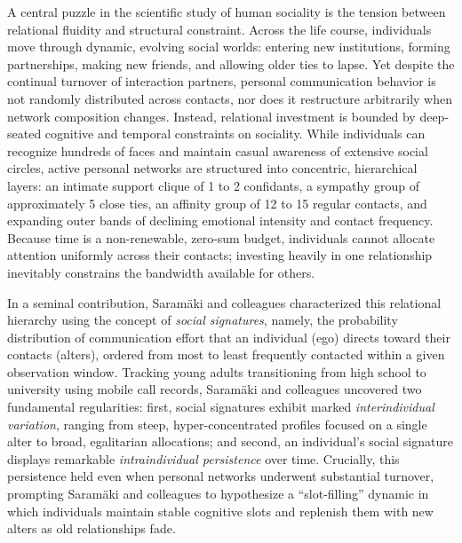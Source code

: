 \documentclass[11pt,letterpaper]{article}
\begin{document}
A central puzzle in the scientific study of human sociality is the tension between relational fluidity and structural constraint.\cite{mcpherson2001birds-2dc,rivera2010dynamics-e3e} Across the life course, individuals move through dynamic, evolving social worlds: entering new institutions, forming partnerships, making new friends, and allowing older ties to lapse.\cite{suitor1997its-18f} Yet despite the continual turnover of interaction partners, personal communication behavior is not randomly distributed across contacts, nor does it restructure arbitrarily when network composition changes. Instead, relational investment is bounded by deep-seated cognitive and temporal constraints on sociality.\cite{dunbar1992neocortex,dunbar1998social,miritello2013time} While individuals can recognize hundreds of faces and maintain casual awareness of extensive social circles, active personal networks are structured into concentric, hierarchical layers: an intimate support clique of 1 to 2 confidants, a sympathy group of approximately 5 close ties, an affinity group of 12 to 15 regular contacts, and expanding outer bands of declining emotional intensity and contact frequency.\cite{dunbar2018anatomy,roberts2009exploring,sutcliffe2012relationships} Because time is a non-renewable, zero-sum budget, individuals cannot allocate attention uniformly across their contacts; investing heavily in one relationship inevitably constrains the bandwidth available for others.\cite{miritello2013time}

In a seminal contribution, Saram{\"a}ki and colleagues\cite{saramaeki2014persistence} characterized this relational hierarchy using the concept of \textit{social signatures}, namely, the probability distribution of communication effort that an individual (ego) directs toward their contacts (alters), ordered from most to least frequently contacted within a given observation window. Tracking young adults transitioning from high school to university using mobile call records, Saram{\"a}ki and colleagues\cite{saramaeki2014persistence} uncovered two fundamental regularities: first, social signatures exhibit marked \textit{interindividual variation}, ranging from steep, hyper-concentrated profiles focused on a single alter to broad, egalitarian allocations; and second, an individual's social signature displays remarkable \textit{intraindividual persistence} over time. Crucially, this persistence held even when personal networks underwent substantial turnover, prompting Saram{\"a}ki and colleagues\cite{saramaeki2014persistence} to hypothesize a ``slot-filling'' dynamic in which individuals maintain stable cognitive slots and replenish them with new alters as old relationships fade.
\end{document}
